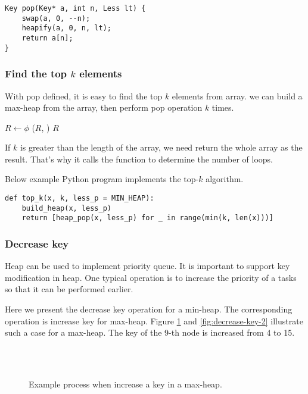 \documentclass{article}
\begin{document}
\lstset{language=C}
\begin{lstlisting}
Key pop(Key* a, int n, Less lt) {
    swap(a, 0, --n);
    heapify(a, 0, n, lt);
    return a[n];
}
\end{lstlisting}

\subsubsection{Find the top $k$ elements}

With pop defined, it is easy to
find the top $k$ elements from array.
we can build a max-heap from the array, then perform
pop operation $k$ times.

\begin{algorithmic}[1]
  \State $R \gets \phi$
  \State {}
    \State {}($R$, )
  \EndFor
  \State \Return $R$
\EndFunction
\end{algorithmic}

If $k$ is greater than the length of the array,
we need return the whole array as the result. That's why it calls
the  function to determine the number of loops.

Below example Python program implements the top-$k$ algorithm.

\lstset{language=Python}
\begin{lstlisting}
def top_k(x, k, less_p = MIN_HEAP):
    build_heap(x, less_p)
    return [heap_pop(x, less_p) for _ in range(min(k, len(x)))]
\end{lstlisting}

\subsubsection{Decrease key}

Heap can be used to implement priority queue. It
is important to support key modification in heap. One typical operation
is to increase the priority of a tasks so that it can be performed
earlier.

Here we present the decrease key operation for a min-heap. The
corresponding operation is increase key for max-heap.
Figure \ref{fig:decrease-key-1} and \ref{fig:decrease-key-2} illustrate such a case for a max-heap.
The key of the 9-th node is increased from 4 to 15.

\begin{figure}[htbp]
    \centering
     \\
     \\
    \caption{Example process when increase a key in a max-heap.} \label{fig:decrease-key-1}
\end{figure}
\end{document}
